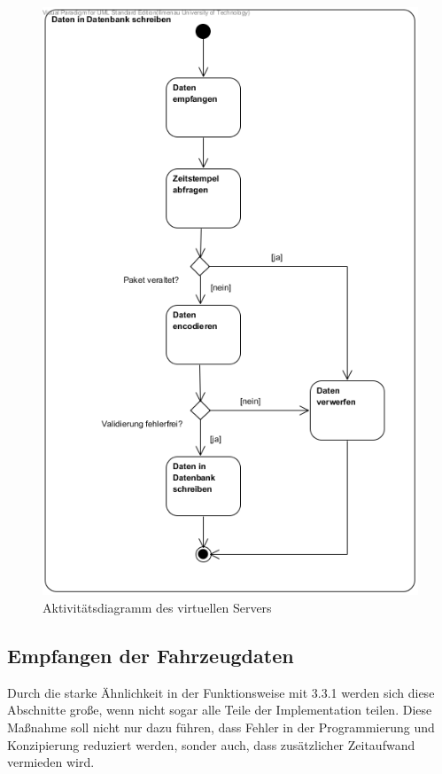 \documentclass[fontsize = 12pt, paper = a4]{scrreprt}
\begin{document}
\begin{figure}[h]
\centering
\includegraphics[scale = 0.70]{activity_vserver.png}
\caption[Aktivitätsdiagramm vServer]{Aktivitätsdiagramm des virtuellen Servers}
\end{figure}

\newpage


\subsection{Empfangen der Fahrzeugdaten}

Durch die starke Ähnlichkeit in der Funktionsweise mit 3.3.1 werden sich diese Abschnitte große, wenn nicht sogar alle Teile der Implementation teilen. Diese Maßnahme soll nicht nur dazu führen, dass Fehler in der Programmierung und Konzipierung reduziert werden, sonder auch, dass zusätzlicher Zeitaufwand vermieden wird. 
\end{document}
